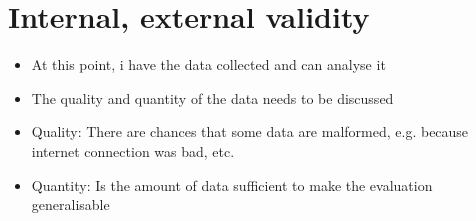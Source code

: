 \section{Internal, external validity}


\begin{itemize}
\item At this point, i have the data collected and can analyse it
\item The quality and quantity of the data needs to be discussed
\item Quality: There are chances that some data are malformed, e.g. because internet connection was bad, etc.
\item Quantity: Is the amount of data sufficient to make the evaluation generalisable
\end{itemize}


